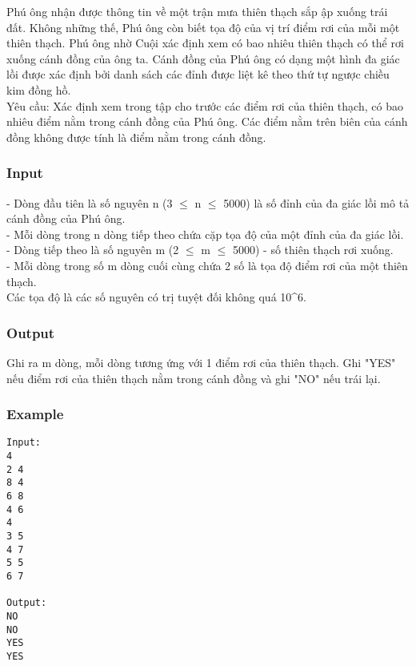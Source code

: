 



   Phú ông nhận được thông tin về một trận mưa thiên thạch sắp ập xuống trái đất. Không những thế, Phú ông còn biết tọa độ của vị trí điểm rơi của mỗi một thiên thạch. Phú ông nhờ Cuội xác định xem có bao nhiêu thiên thạch có thể rơi xuống cánh đồng của ông ta. Cánh đồng của Phú ông có dạng một hình đa giác lồi được xác định bởi danh sách các đỉnh được liệt kê theo thứ tự ngược chiều kim đồng hồ.   
\\       Yêu cầu:      Xác định xem trong tập cho trước các điểm rơi của thiên thạch, có bao nhiêu điểm nằm trong cánh đồng của Phú ông. Các điểm nằm trên biên của cánh đồng không được tính là điểm nằm trong cánh đồng.  

\subsubsection{   Input  }

   - Dòng đầu tiên là số nguyên n (3  $\le$  n  $\le$  5000) là số đỉnh của đa giác lồi mô tả cánh đồng của Phú ông.   
\\   - Mỗi dòng trong n dòng tiếp theo chứa cặp tọa độ của một đỉnh của đa giác lồi.   
\\   - Dòng tiếp theo là số nguyên m (2  $\le$  m  $\le$  5000) - số thiên thạch rơi xuống.   
\\   - Mỗi dòng trong số m dòng cuối cùng chứa 2 số là tọa độ điểm rơi của một thiên thạch.   
\\   Các tọa độ là các số nguyên có trị tuyệt đối không quá 10\textasciicircum6.  

\subsubsection{   Output  }

   Ghi ra m dòng, mỗi dòng tương ứng với 1 điểm rơi của thiên thạch. Ghi "YES" nếu điểm rơi của thiên thạch nằm trong cánh đồng và ghi "NO" nếu trái lại.  

\subsubsection{   Example  }
\begin{verbatim}
Input:
4
2 4
8 4
6 8
4 6
4
3 5
4 7
5 5
6 7

Output:
NO
NO
YES
YES
\end{verbatim}
